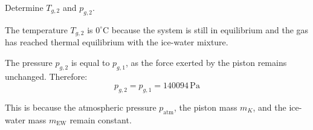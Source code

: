 Determine \( T_{g,2} \) and \( p_{g,2} \).

The temperature \( T_{g,2} \) is \( 0^\circ\text{C} \) because the system is still in equilibrium and the gas has reached thermal equilibrium with the ice-water mixture.  

The pressure \( p_{g,2} \) is equal to \( p_{g,1} \), as the force exerted by the piston remains unchanged. Therefore:  
\[
p_{g,2} = p_{g,1} = 140094 \, \text{Pa}
\]  

This is because the atmospheric pressure \( p_{\text{atm}} \), the piston mass \( m_K \), and the ice-water mass \( m_{\text{EW}} \) remain constant.